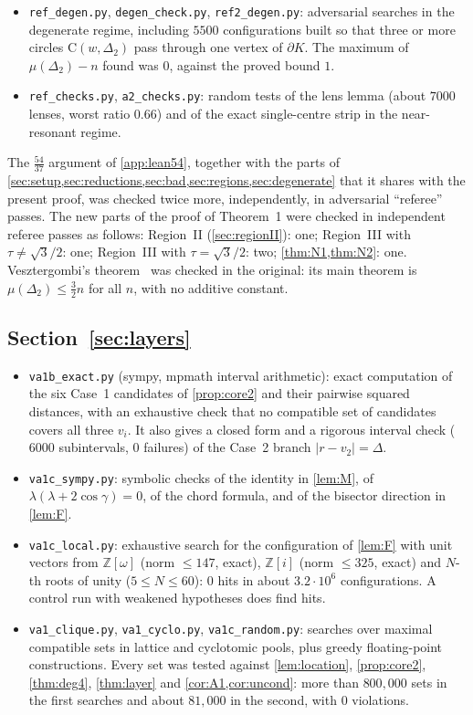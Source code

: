 \documentclass[11pt]{amsart}
\theoremstyle{definition}
\theoremstyle{remark}
\newcommand{\Dt}{\Delta_2}
\newcommand{\mult}{\mu}
\newcommand{\Cc}{\mathrm{C}}      %
\begin{document}
\begin{itemize}[leftmargin=2em]
\item \texttt{ref\_degen.py}, \texttt{degen\_check.py}, \texttt{ref2\_degen.py}: adversarial searches in the degenerate regime, including $5500$ configurations built so that three or more circles $\Cc(w,\Dt)$ pass through one vertex of $\partial K$. The maximum of $\mult(\Dt)-n$ found was $0$, against the proved bound $1$.
\item \texttt{ref\_checks.py}, \texttt{a2\_checks.py}: random tests of the lens lemma (about $7000$ lenses, worst ratio $0.66$) and of the exact single-centre strip in the near-resonant regime.
\end{itemize}
The $\frac{54}{37}$ argument of \cref{app:lean54}, together with the parts of \cref{sec:setup,sec:reductions,sec:bad,sec:regions,sec:degenerate} that it shares with the present proof, was checked twice more, independently, in adversarial ``referee'' passes. The new parts of the proof of Theorem~1 were checked in independent referee passes as follows: Region~II (\cref{sec:regionII}): one; Region~III with $\tau\neq\sqrt3/2$: one; Region~III with $\tau=\sqrt3/2$: two; \cref{thm:N1,thm:N2}: one. Vesztergombi's theorem~\cite{Ve87} was checked in the original: its main theorem is $\mult(\Dt)\le\frac32n$ for all $n$, with no additive constant.

\subsection*{\texorpdfstring{Section~\ref{sec:layers}}{Layer bound}}
\begin{itemize}[leftmargin=2em]
\item \texttt{va1b\_exact.py} (sympy, mpmath interval arithmetic): exact computation of the six Case~1 candidates of \cref{prop:core2} and their pairwise squared distances, with an exhaustive check that no compatible set of candidates covers all three $v_i$. It also gives a closed form and a rigorous interval check ($6000$ subintervals, $0$ failures) of the Case~2 branch $|r-v_2|=\Delta$.
\item \texttt{va1c\_sympy.py}: symbolic checks of the identity in \cref{lem:M}, of $\lambda(\lambda+2\cos\gamma)=0$, of the chord formula, and of the bisector direction in \cref{lem:F}.
\item \texttt{va1c\_local.py}: exhaustive search for the configuration of \cref{lem:F} with unit vectors from $\mathbb Z[\omega]$ (norm $\le147$, exact), $\mathbb Z[i]$ (norm $\le325$, exact) and $N$-th roots of unity ($5\le N\le60$): $0$ hits in about $3.2\cdot10^6$ configurations. A control run with weakened hypotheses does find hits.
\item \texttt{va1\_clique.py}, \texttt{va1\_cyclo.py}, \texttt{va1c\_random.py}: searches over maximal compatible sets in lattice and cyclotomic pools, plus greedy floating-point constructions. Every set was tested against \cref{lem:location}, \cref{prop:core2}, \cref{thm:deg4}, \cref{thm:layer} and \cref{cor:A1,cor:uncond}: more than $800{,}000$ sets in the first searches and about $81{,}000$ in the second, with $0$ violations.
\end{itemize}
\end{document}
